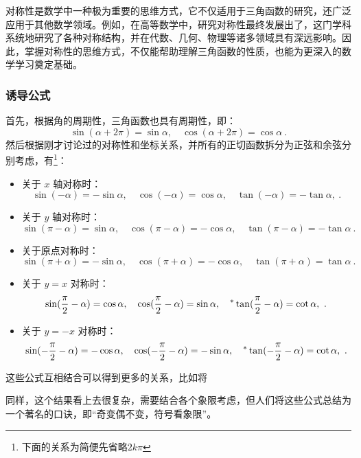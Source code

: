 对称性是数学中一种极为重要的思维方式，它不仅适用于三角函数的研究，还广泛应用于其他数学领域。例如，在高等数学中，研究对称性最终发展出了，这门学科系统地研究了各种对称结构，并在代数、几何、物理等诸多领域具有深远影响。因此，掌握对称性的思维方式，不仅能帮助理解三角函数的性质，也能为更深入的数学学习奠定基础。

\subsubsection{诱导公式}

首先，根据角的周期性，三角函数也具有周期性，即：
\begin{equation}
\sin(\alpha + 2\pi) = \sin \alpha, \quad \cos(\alpha + 2\pi) = \cos \alpha~.
\end{equation}
然后根据刚才讨论过的对称性和坐标关系，并所有的正切函数拆分为正弦和余弦分别考虑，有\footnote{下面的关系为简便先省略$2k\pi$}：
\begin{itemize}
\item 关于 $x$ 轴对称时：
\begin{equation}
\sin(-\alpha)=-\sin\alpha,\quad \cos(-\alpha) = \cos \alpha,\quad \tan(-\alpha)=-\tan\alpha,~.
\end{equation}
\item 关于 $y$ 轴对称时：
\begin{equation}
\sin(\pi-\alpha)=\sin\alpha,\quad \cos(\pi-\alpha) = -\cos \alpha,\quad \tan(\pi-\alpha)=-\tan\alpha~.
\end{equation}
\item 关于原点对称时：
\begin{equation}
\sin(\pi+\alpha)=-\sin\alpha,\quad \cos(\pi+\alpha) = -\cos \alpha,\quad \tan(\pi+\alpha) = \tan \alpha~.
\end{equation}
\item 关于 $y = x$ 对称时：
\begin{equation}
\sin({\pi\over2}-\alpha)=\cos\alpha,\quad \cos({\pi\over2}-\alpha) = \sin \alpha,\quad ^*\tan({\pi\over2}-\alpha) = \cot \alpha,~.
\end{equation}
\item 关于 $y = -x$ 对称时：
\begin{equation}
\sin(-{\pi\over2}-\alpha)=-\cos\alpha,\quad \cos(-{\pi\over2}-\alpha) = -\sin \alpha,\quad ^*\tan(-{\pi\over2}-\alpha) = \cot \alpha,~.
\end{equation}
\end{itemize}
这些公式互相结合可以得到更多的关系，比如将

同样，这个结果看上去很复杂，需要结合各个象限考虑，但人们将这些公式总结为一个著名的口诀，即“奇变偶不变，符号看象限”。

